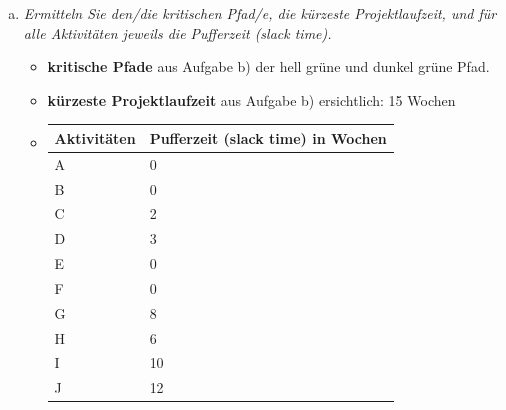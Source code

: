 \begin{enumerate}[(a)]
    \item {\itshape Ermitteln Sie den/die kritischen Pfad/e, die kürzeste Projektlaufzeit, und für alle Aktivitäten jeweils die Pufferzeit (slack time).}
        \begin{itemize}
            \item \textbf{kritische Pfade} aus Aufgabe b) der hell grüne und dunkel grüne Pfad.
            \item \textbf{kürzeste Projektlaufzeit} aus Aufgabe b) ersichtlich: 15 Wochen
            \item[] \begin{tabular}{|l|l|}
                \hline
                \textbf{Aktivitäten} &  \textbf{Pufferzeit (slack time)} in Wochen\\ \hline  
                A & 0 \\ \hline 
                B & 0 \\ \hline 
                C & 2 \\ \hline 
                D & 3 \\ \hline 
                E & 0 \\ \hline 
                F & 0 \\ \hline 
                G & 8 \\ \hline 
                H & 6 \\ \hline 
                I & 10 \\ \hline 
                J & 12\\ \hline 
            \end{tabular}
        \end{itemize}


\end{enumerate}
